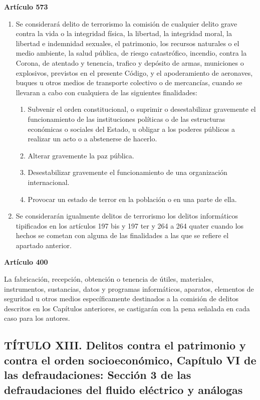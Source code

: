 \textbf{Artículo 573}
\begin{enumerate}[label=\textbf{\arabic*.}]
    \item Se considerará delito de terrorismo la comisión de cualquier delito grave contra la vida o la integridad física, la libertad, la integridad moral, la libertad e indemnidad sexuales, el patrimonio, los recursos naturales o el medio ambiente, la salud pública, de riesgo catastrófico, incendio, contra la Corona, de atentado y tenencia, trafico y depósito de armas, municiones o explosivos, previstos en el presente Código, y el apoderamiento de aeronaves, buques u otros medios de transporte colectivo o de mercancías, cuando se llevaran a cabo con cualquiera de las siguientes finalidades:
          \begin{enumerate}[label=\arabic*.a]
              \item Subvenir el orden constitucional, o suprimir o desestabilizar gravemente el funcionamiento de las instituciones políticas o de las estructuras económicas o sociales del Estado, u obligar a los poderes públicos a realizar un acto o a abstenerse de hacerlo.
              \item Alterar gravemente la paz pública.
              \item Desestabilizar gravemente el funcionamiento de una organización internacional.
              \item Provocar un estado de terror en la población o en una parte de ella.
          \end{enumerate}
    \item Se considerarán igualmente delitos de terrorismo los delitos informáticos tipificados en los artículos 197 bis y 197 ter y 264 a 264 quater cuando los hechos se cometan con alguna de las finalidades a las que se refiere el apartado anterior.
\end{enumerate}

\textbf{Artículo 400}

La fabricación, recepción, obtención o tenencia de útiles, materiales, instrumentos, sustancias, datos y programas informáticos, aparatos, elementos de seguridad u otros medios específicamente destinados a la comisión de delitos descritos en los Capítulos anteriores, se castigarán con la pena señalada en cada caso para los autores.


\subsection{TÍTULO XIII. Delitos contra el patrimonio y contra el orden socioeconómico, Capítulo VI de las defraudaciones: Sección 3 de las defraudaciones del fluido eléctrico y análogas}

